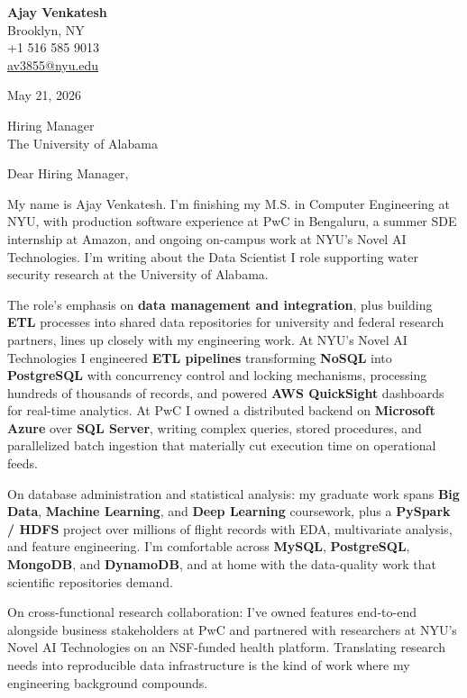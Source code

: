 \documentclass[letterpaper,11pt]{article}
\begin{document}
\begin{flushleft}
\textbf{\large Ajay Venkatesh} \\
Brooklyn, NY \\
+1 516 585 9013 \\
\href{mailto:av3855@nyu.edu}{av3855@nyu.edu}
\end{flushleft}
\vspace{10pt}
May 21, 2026
\vspace{6pt}

Hiring Manager \\
The University of Alabama

\vspace{10pt}

Dear Hiring Manager,

My name is Ajay Venkatesh. I'm finishing my M.S. in Computer Engineering at NYU, with production software experience at PwC in Bengaluru, a summer SDE internship at Amazon, and ongoing on-campus work at NYU's Novel AI Technologies. I'm writing about the Data Scientist I role supporting water security research at the University of Alabama.

The role's emphasis on \textbf{data management and integration}, plus building \textbf{ETL} processes into shared data repositories for university and federal research partners, lines up closely with my engineering work. At NYU's Novel AI Technologies I engineered \textbf{ETL pipelines} transforming \textbf{NoSQL} into \textbf{PostgreSQL} with concurrency control and locking mechanisms, processing hundreds of thousands of records, and powered \textbf{AWS QuickSight} dashboards for real-time analytics. At PwC I owned a distributed backend on \textbf{Microsoft Azure} over \textbf{SQL Server}, writing complex queries, stored procedures, and parallelized batch ingestion that materially cut execution time on operational feeds.

On database administration and statistical analysis: my graduate work spans \textbf{Big Data}, \textbf{Machine Learning}, and \textbf{Deep Learning} coursework, plus a \textbf{PySpark / HDFS} project over millions of flight records with EDA, multivariate analysis, and feature engineering. I'm comfortable across \textbf{MySQL}, \textbf{PostgreSQL}, \textbf{MongoDB}, and \textbf{DynamoDB}, and at home with the data-quality work that scientific repositories demand.

On cross-functional research collaboration: I've owned features end-to-end alongside business stakeholders at PwC and partnered with researchers at NYU's Novel AI Technologies on an NSF-funded health platform. Translating research needs into reproducible data infrastructure is the kind of work where my engineering background compounds.
\end{document}
